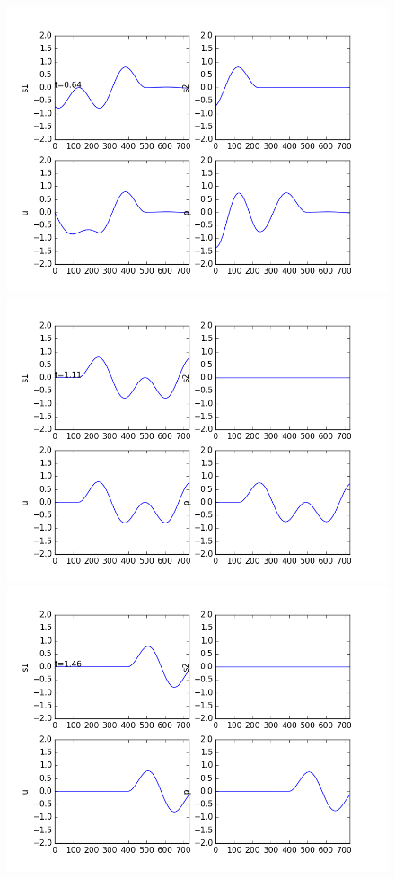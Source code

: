 \documentclass[12pt]{article}
\begin{document}
\begin{enumerate}[(a)]
\begin{figure}[H]
\centering\includegraphics[scale=0.4]{frame3.png}
\centering\includegraphics[scale=0.4]{frame4.png}
\centering\includegraphics[scale=0.4]{frame5.png}

\end{figure}
\end{enumerate}
\end{document}
